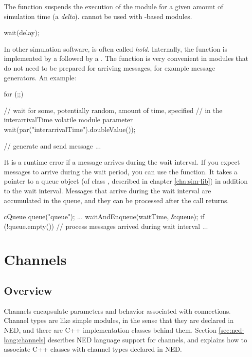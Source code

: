 \begin{ned}
The  function suspends the execution of the module for a
given amount of simulation time (a \textit{delta}).  cannot
be used with -based modules.

\begin{cpp}
wait(delay);
\end{cpp}

In other simulation software,  is often called \textit{hold}.
Internally, the  function is implemented by a
 followed by a .
The  function is very convenient in modules that do not need
to be prepared for arriving messages, for example message generators.
An example:

\begin{cpp}
for (;;) {
    // wait for some, potentially random, amount of time, specified
    // in the interarrivalTime volatile module parameter
    wait(par("interarrivalTime").doubleValue());

    // generate and send message
    ...
}
\end{cpp}

It is a runtime error if a message arrives during the wait interval.
If you expect messages to arrive during the wait period, you can
use the  function. It takes a pointer to a queue object
(of class , described in chapter \ref{cha:sim-lib})
in addition to the wait interval. Messages that arrive during the
wait interval are accumulated in the queue, and they can be
processed after the  call returns.

\begin{cpp}
cQueue queue("queue");
...
waitAndEnqueue(waitTime, &queue);
if (!queue.empty())
{
    // process messages arrived during wait interval
    ...
}
\end{cpp}


\section{Channels}
\label{sec:simple-modules:channels}

\subsection{Overview}
\label{sec:simple-modules:channels-overview}

Channels encapsulate parameters and behavior associated with connections.
Channel types are like simple modules, in the sense that they are declared
in NED, and there are C++ implementation classes behind them. Section
\ref{sec:ned-lang:channels} describes NED language support for channels,
and explains how to associate C++ classes with channel types declared in
NED.


\end{ned}
